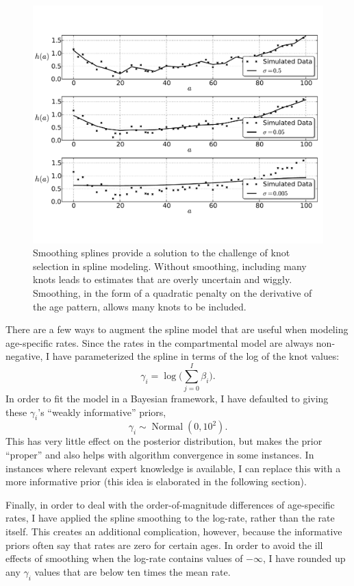 \documentclass[12pt]{article}
\newcommand{\1}{\mathbf{1}}
\newcommand{\0}{\mathbf{0}}
\newcommand{\Normal}{\operatorname{Normal}}
\begin{document}
\begin{figure}[h]
\begin{center}
\includegraphics[width=\textwidth]{smoothing-splines.pdf}
\caption{Smoothing splines provide a solution to the challenge of knot
  selection in spline modeling.  Without smoothing, including many
  knots leads to estimates that are overly uncertain and wiggly.
  Smoothing, in the form of a quadratic penalty on the derivative of
  the age pattern, allows many knots to be included.}
\label{smoothing-splines}
\end{center}
\end{figure}

There are a few ways to augment the spline model that are useful when
modeling age-specific rates. Since the rates in the compartmental
model are always non-negative, I have parameterized the spline in
terms of the log of the knot values:
\[
\gamma_i = \log\bigg(\sum_{j=0}^I \beta_i\bigg).
\]
In order to fit the model in a Bayesian framework, I have defaulted to
giving these $\gamma_i$'s ``weakly informative'' priors,
\[
\gamma_i \sim \Normal\left(0, 10^2\right).
\]
This has very little effect on the posterior distribution, but makes
the prior ``proper'' and also helps with algorithm convergence in
some instances. In instances where relevant expert knowledge is
available, I can replace this with a more informative prior (this idea
is elaborated in the following section).

Finally, in order to deal with the order-of-magnitude differences of
age-specific rates, I have applied the spline smoothing to the
log-rate, rather than the rate itself.  This creates an additional
complication, however, because the informative priors often say that
rates are zero for certain ages.  In order to avoid the ill effects of
smoothing when the log-rate contains values of $-\infty$, I have
rounded up any $\gamma_i$ values that are below ten times the mean
rate.
\end{document}
